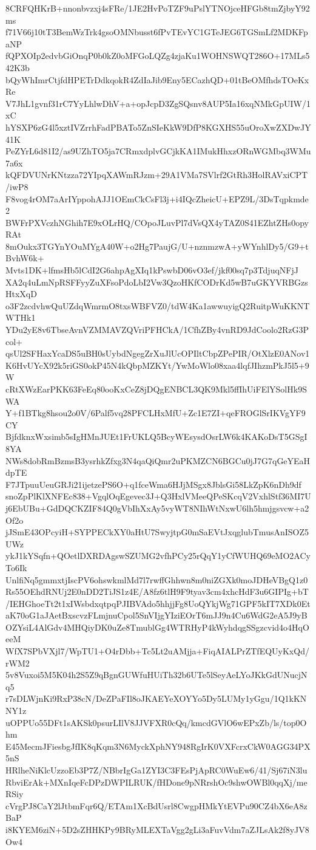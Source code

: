 8CRFQHKrB+nnonbvzxj4sFRe/1JE2HvPoTZF9uPslYTNOjceHFGb8tmZjbyY92ms
f71V66j10tT3BemWzTrk4gsoOMNbusst6fPvTEvYC1GTeJEG6TGSmLf2MDKFpaNP
fQPXOIp2edvbGiOnqP0b0kZ0oMFGoLQZg4zjaKu1WOHNSWQT286O+17MLs542K3b
bQyWhImrCtjfdHPETrDdkqokR4ZdIaJib9Eny5ECazhQD+01tBeOMfhdsTOeKxRe
V7JhL1gvnf31rC7YyLhlwDhV+a+opJcpD3ZgSQsnv8AUP5Ia16xqNMkGpUIW/1xC
hYSXP6zG4l5xztIVZrrhFadPBATo5ZnSIeKkW9DfP8KGXHS55uOroXwZXDwJY41K
PeZYrL6d81I2/as9UZhTO5ja7CRmxdplvGCjkKA1IMukHhxzORnWGMbq3WMu7a6x
kQFDVUNrKNtzza72YIpqXAWmRJzm+29A1VMa7SVlrf2GtRh3HolRAVxiCPT/iwP8
F8vog4rOM7aArIYppohAJJ1OEmCkCsFl3j+i4IQcZheicU+EPZ9L/3DsTqpkmde2
BWFrPXVczhNGhih7E9xOLrHQ/COpoJLuvPl7dVsQX4yTAZ0S41EZhtZHs0opyRAt
8mOukx3TGYnYOuMYgA40W+o2Hg7PaujG/U+nznmzwA+yWYnhlDy5/G9+tBvhW6k+
Mvts1DK+lfmsHb5lCdI2G6ahpAgXIq1kPswbD06vO3ef/jkf00sq7p3TdjuqNFjJ
XA2q4uLmNpRSFFyyZuXFsoPdoLbI2Vw3QzoHKfCODrKd5wB7uGKYVRBGzsHtxXqD
o3F2zcdvhwQuUZdqWmrmO8txsWBFVZ0/tdW4Ka1awwuyigQ2RuitpWuKKNTWTHk1
YDu2yE8v6TbseAvnVZMMAVZQVriPFHCkA/1CfhZBy4vnRD9JdCoolo2RzG3Pcol+
qsUl2SFHaxYcaDS5uBH0sUybdNgegZrXuJlUcOPIltCbpZPePIR/OtXlzE0ANov1
K6HvUYcX92k5riGS0okP45N4kQbpMZKYt/YwMoWlo08xaa4lqfJIhzmPkJ5l5+9W
cRtXWzEarPKK63FeEq80ooKxCeZ8jDQgENBCL3QK9Mkl5ffIhUiFElYSolHk9SWA
Y+f1BTkg8hsou2o0V/6Palf5vq28PFCLHxMfU+Zc1E7ZI+qeFROGlSrIKVgYF9CY
BjfdknxWxsimb5sIgHMnJUEt1FrUKLQ5BcyWEsysdOsrLW6k4KAKoDsT5GSgI8YA
NWs8dobRmBzmsB3ysrhkZfxg3N4qaQiQmr2uPKMZCN6BGCu0jJ7G7qGeYEaHdpTE
F7JTpuuUeuGRJi21ijetzePS6O+q1fceWma6HJjMSgx8JblsGi58LkZpK6nDh9df
snoZpPlKlXNFEc838+VgqlOqEgevec3J+Q3HxlVMeeQPeSKcqV2VxhlStf36MI7U
j6EbUBu+GdDQCKZIF84Q0gVbIhXxAy5vyWT8NIhWtNxwU6lh5hmjgsvcw+a2Of2o
jJSmE43OPcyiH+SYPPECkXY0aHtU7SwyjtpG0mSaEVtJxqglubTmusAnISOZ5UWz
ykJ1kYSqfn+QOetlDXRDAgswSZUMG2vfhPCy25rQqY1yCfWUHQ69eMO2ACyTo6Ik
UnlfiNq5gmmxtjIscPV6ohswkmlMd7l7rwffGhhwn8m0niZGXk0moJDHeVBgQ1z0
Rs55OEhdRNUj2E0nDD2TiJS1z4E/A8fz6tlH9F9tyav3cm4xhcHdF3u6GIPIg+bT
/IEHGhoeTt2t1xIWsbdxqtpqPJIBVAdo5hhjjFg8UoQYkjWg71GPF5kIT7XDk0Et
aK70oG1aJAetBxscvzFLmjnuCpol5SnVIjgYIziEOrT6mJJ9n4Cu6WdG2eA5J9yB
OZYsiL4AlGdv4MHQiyDK0uZe8TmublGg4WTRHyP4kWyhdqgSSgzcvid4o4HqOeeM
WfX7SPbVXjl7/WpTU1+O4rDbb+Tc5Lt2uAMjja+FiqAIALPrZTfEQUyKxQd/rWM2
5v8Vuxoi5M5K04h2S5Z9qBgnGUWfuHUiTh32b6UTe5lSeyAeLYoJKkGdUNucjNq5
r7sDLWjnKi9RxP38cN/DeZPaFIl8oJKAEYeXOYYo5Dy5LUMy1yGgu/1Q1kKNNY1z
uOPPUo55DFt1sAKSk0psurLIlV8JJVFXR0cQq/kmcdGVlO6wEPxZb/ls/top0Ohm
E45MecmJFiesbgJfIK8qKqm3N6MyckXphNY948RgIrK0VXFcrxCkW0AGG34PX5nS
HRlheNiKlcUzzoEb3P7Z/NBbrIgGa1ZYI3C3FEsPjApRC0WuEw6/41/Sj67iN3lu
RbviErAk+MXnIqeFcDPzDWPILRUK/fHDone9pNRrshOc9shwOWBl0qqXj/meRSiy
cVrgPJ8CaY2lJtbmFqr6Q/ETAm1XcBdUsrl8CwgpHMkYtEVPu90CZ4bX6eA8zBaP
i8KYEM6ziN+5D2sZHHKPy9BRyMLEXTaVgg2gLi3aFuvVdm7aZJLsAk2f8yJV8Ow4
